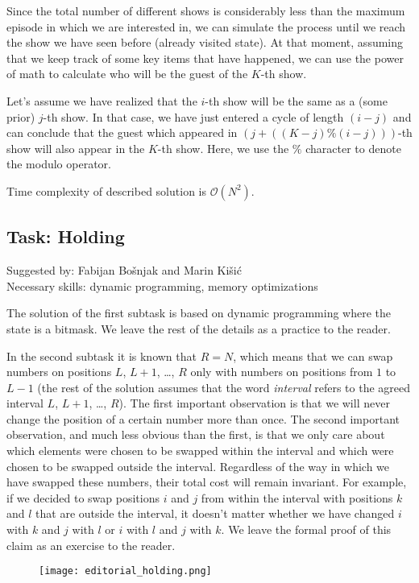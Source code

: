 \documentclass[a4paper]{article}
\begin{document}
Since the total number of different shows is considerably less than the maximum
episode in which we are interested in, we can simulate the process until we
reach the show we have seen before (already visited state). At that moment,
assuming that we keep track of some key items that have happened, we can use
the power of math to calculate who will be the guest of the $K$-th show.

Let's assume we have realized that the $i$-th show will be the same as a
(some prior) $j$-th show. In that case, we have just entered a cycle of
length $(i-j)$ and can conclude that the guest which appeared in $(j + ((K -
j) \% (i - j)))$-th show will also appear in the $K$-th show. Here, we
use the $\%$ character to denote the modulo operator.

Time complexity of described solution is $\mathcal{O}(N^2)$.

\subsection*{Task: Holding}
\textsf{Suggested by: Fabijan Bošnjak and Marin Kišić}\\
\textsf{Necessary skills: dynamic programming, memory optimizations}

The solution of the first subtask is based on dynamic programming where the
state is a bitmask. We leave the rest of the details as a practice to the reader.

In the second subtask it is known that $R = N$, which means that we can swap
numbers on positions $L$, $L+1$, \dots, $R$ only with numbers on positions from
$1$ to $L-1$ (the rest of the solution assumes that the word \textit{interval}
refers to the agreed interval $L$, $L+1$, \dots, $R$). The first important observation
is that we will never change the position of a certain number more than once. The
second important observation, and much less obvious than the first, is that we
only care about which elements were chosen to be swapped within the interval and which were
chosen to be swapped outside the interval. Regardless of the way in which we have
swapped these numbers, their total cost will remain invariant. For example, if we
decided to swap positions $i$ and $j$ from within the interval with positions $k$
and $l$ that are outside the interval, it doesn't matter whether we have changed
$i$ with $k$ and $j$ with $l$ or $i$ with $l$ and $j$ with $k$. We leave the
formal proof of this claim as an exercise to the reader.

\begin{figure}[!htbp]
\centering
\texttt{[image: editorial\_holding.png]}
\end{figure}
\end{document}
